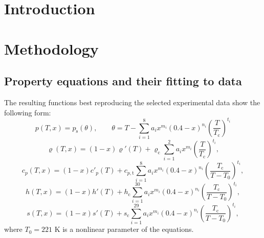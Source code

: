 \documentclass[11pt]{article}
\newcommand{\dens}{\varrho}
\begin{document}
\section{Introduction}

\section{Methodology}

\subsection{Property equations and their fitting to data}


\noindent The resulting functions best reproducing the selected
experimental data show the following form:
\begin{equation}
p(T,x) = p_\mathrm{s}(\theta), \qquad
\theta = T - \sum_{i=1}^{8} a_i x^{m_i}(0.4-x)^{n_i}
         \left(\frac{T}{T_\mathrm{c}}\right)^{t_i}
\end{equation}
\begin{equation}
\dens(T,x) = (1-x)\dens'(T) + \dens_\mathrm{c}
  \sum_{i=1}^{2} a_i x^{m_i}
  \left(\frac{T}{T_\mathrm{c}}\right)^{t_i},
\end{equation}
\begin{equation}
c_p(T,x) = (1-x)c'_p(T) + c_{p,\mathrm{t}}
  \sum_{i=1}^{8} a_i x^{m_i}(0.4-x)^{n_i}
  \left(\frac{T_\mathrm{c}}{T-T_0}\right)^{t_i},
\end{equation}
\begin{equation}
h(T,x) = (1-x)h'(T) + h_\mathrm{c}
  \sum_{i=1}^{30} a_i x^{m_i}(0.4-x)^{n_i}
  \left(\frac{T_\mathrm{c}}{T-T_0}\right)^{t_i},
\end{equation}
\begin{equation}
s(T,x) = (1-x)s'(T) + s_\mathrm{c}
  \sum_{i=1}^{29} a_i x^{m_i}(0.4-x)^{n_i}
  \left(\frac{T_\mathrm{c}}{T-T_0}\right)^{t_i},
\end{equation}
where $T_0 = 221$ K is a nonlinear parameter of the equations.
\end{document}
